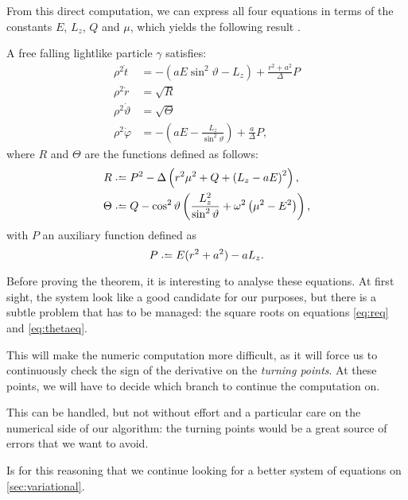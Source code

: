 From this direct computation, we can express all four equations in terms of the constants $E$, $L_z$, $Q$ and $\mu$, which yields the following result \cite[p. 899]{thorne73}.

\begin{theorem}
	\label{theo:firsteqs}
	A free falling lightlike particle $\gamma$ satisfies:
	\begin{align}
		\label{eq:teq}
		\rho^2 \dot{t} &=-( aE\sin^2\vartheta - L_z) + \frac{r^2+a^2}{\Delta}P \\
		\label{eq:req}
		\rho^2 \dot{r} &= \sqrt{R} \\
		\label{eq:thetaeq}
		\rho^2 \dot{\vartheta} &= \sqrt{\Theta} \\
		\label{eq:phieq}
		\rho^2 \dot{\varphi} &=-( aE - \frac{L_z}{\sin^2\vartheta}) + \frac{a}{\Delta}P,
	\end{align}
	where $R$ and $\Theta$ are the functions defined as follows:
	\begin{align}
		\label{eq:defR}
		R &\defeq P^2 - \Delta \left( r^2\mu^2 + Q + \left(L_z - aE \right)^2 \right), \\
		\label{eq:defTheta}
		\Theta &\defeq Q - \cos^2\vartheta \left( \frac{L_z^2}{\sin^2\vartheta} + \omega^2\left(\mu^2 - E^2 \right)\right),
	\end{align}
	with $P$ an auxiliary function defined as
	\begin{equation}
		\label{eq:defP}
		P \defeq E(r^2 + a^2) - aL_z.
	\end{equation}
\end{theorem}

Before proving the theorem, it is interesting to analyse these equations. At first sight, the system look like a good candidate for our purposes, but there is a subtle problem that has to be managed: the square roots on equations \ref{eq:req} and \ref{eq:thetaeq}.

This will make the numeric computation more difficult, as it will force us to continuously check the sign of the derivative on the \emph{turning points}. At these points, we will have to decide which branch to continue the computation on.

This can be handled, but not without effort and a particular care on the numerical side of our algorithm: the turning points would be a great source of errors that we want to avoid.

Is for this reasoning that we continue looking for a better system of equations on \autoref{sec:variational}.


